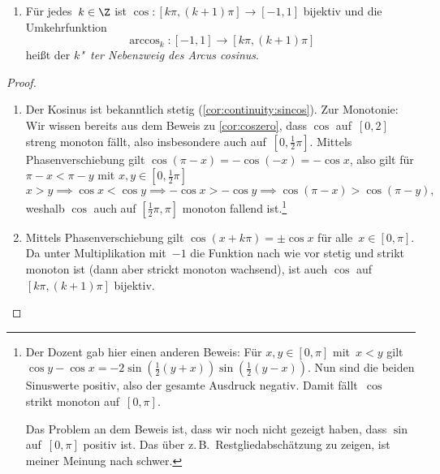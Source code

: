\documentclass[a4paper]{article}
\begin{document}
\begin{theorem}[Arkuskosinus]
\begin{enumerate}
\begin{center}
              \end{center}
        \item Für jedes~$k \in \Z$ ist $\cos\colon [k\pi,(k+1)\pi] \to [-1, 1]$ bijektiv und die Umkehrfunktion
              \begin{equation*}
                  \arccos_k\colon [-1, 1] \to [k\pi,(k+1)\pi]
              \end{equation*}
              heißt der \emph{$k$"~ter Nebenzweig des Arcus cosinus}.
    \end{enumerate}
\end{theorem}

\begin{proof}\leavevmode
    \begin{enumerate}
        \item Der Kosinus ist bekanntlich stetig (\cref{cor:continuity:sincos}). Zur Monotonie: Wir wissen bereits aus dem Beweis zu \cref{cor:coszero}, dass $\cos$ auf~$[0, 2]$ streng monoton fällt, also insbesondere auch auf~$[0,\frac{1}{2}\pi]$. Mittels Phasenverschiebung gilt $\cos(\pi-x) = -\cos(-x) = -\cos x$, also gilt für $\pi-x < \pi-y$ mit $x,y \in [0,\frac{1}{2}\pi]$
              \begin{equation*}
                  x > y \implies \cos x < \cos y \implies -\cos x > -\cos y \implies \cos(\pi-x) > \cos(\pi-y),
              \end{equation*}
              weshalb $\cos$ auch auf $[\frac{1}{2}\pi,\pi]$ monoton fallend ist.\footnote{Der Dozent gab hier einen anderen Beweis: Für $x,y \in [0,\pi]$ mit~$x < y$ gilt $\cos y-\cos x = -2 \sin(\frac{1}{2}(y+x)) \sin(\frac{1}{2}(y-x))$. Nun sind die beiden Sinuswerte positiv, also der gesamte Ausdruck negativ. Damit fällt~$\cos$ strikt monoton auf~$[0,\pi]$.

                  Das Problem an dem Beweis ist, dass wir noch nicht gezeigt haben, dass $\sin$ auf~$[0,\pi]$ positiv ist. Das über z.\,B.\ Restgliedabschätzung zu zeigen, ist meiner Meinung nach schwer.}
        \item Mittels Phasenverschiebung gilt $\cos(x+k\pi) = \pm\cos x$ für alle~$x \in [0,\pi]$. Da unter Multiplikation mit~$-1$ die Funktion nach wie vor stetig und strikt monoton ist (dann aber strickt monoton wachsend), ist auch $\cos$ auf $[k\pi,(k+1)\pi]$ bijektiv.\qedhere
    \end{enumerate}
\end{proof}
\end{document}
